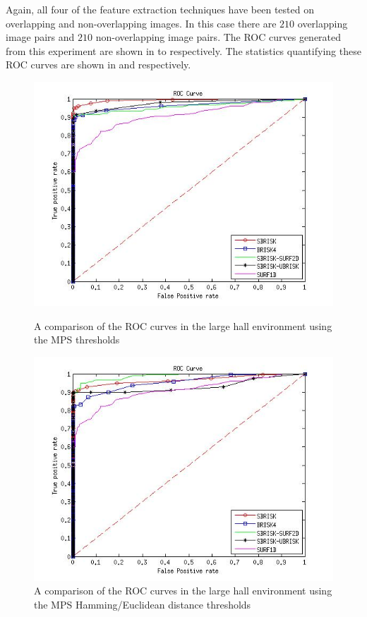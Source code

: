 \documentclass[11pt]{report}
\begin{document}
Again, all four of the feature extraction techniques have been tested on overlapping and non-overlapping images. In this case there are $210$ overlapping image pairs and $210$ non-overlapping image pairs. The ROC curves generated from this experiment are shown in  to  respectively. The statistics quantifying these ROC curves are shown in  and  respectively.\\

\begin{figure}[h!]
\begin{minipage}[b]{0.5\linewidth}
\includegraphics[scale=0.4]{../Drawings/dataset3_ROC_General_KNN.jpg}
\caption{A comparison of the ROC curves in the large hall environment using the MPS thresholds}
\label{fig:compareKnnOffice3}
\end{minipage}
\hspace{0.5cm}
\begin{minipage}[b]{0.5\linewidth}
\includegraphics[scale=0.4]{../Drawings/dataset3_ROC_General_Hamming.jpg}
\caption{A comparison of the ROC curves in the large hall environment using the MPS Hamming/Euclidean distance thresholds}
\label{fig:compareHammingOffice3}
\end{minipage}
\end{figure}
\end{document}
